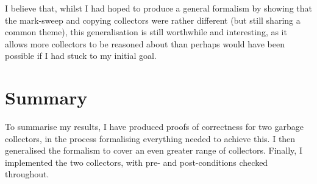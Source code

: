 I believe that, whilst I had hoped to produce a general formalism by
showing that the mark-sweep and copying collectors were rather
different (but still sharing a common theme), this generalisation is
still worthwhile and interesting, as it allows more collectors to be
reasoned about than perhaps would have been possible if I had stuck to
my initial goal.

\section{Summary}
\label{sec:results-summary}

To summarise my results, I have produced proofs of correctness for two
garbage collectors, in the process formalising everything needed to
achieve this. I then generalised the formalism to cover an even
greater range of collectors. Finally, I implemented the two
collectors, with pre- and post-conditions checked throughout.